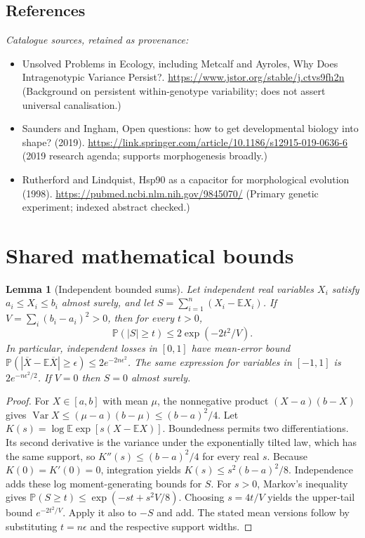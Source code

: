 \documentclass[11pt]{article}
\newcommand{\E}{\mathbb E}
\newcommand{\Prob}{\mathbb P}
\DeclareMathOperator{\Var}{Var}
\providecommand{\E}{\mathbb E}
\providecommand{\Prob}{\mathbb P}
\providecommand{\Var}{\operatorname{Var}}
\newtheorem{sharedlemma}{Lemma}[section]
\begin{document}
\subsection{References}
\noindent\emph{Catalogue sources, retained as provenance:}
\begin{itemize}
\item Unsolved Problems in Ecology, including Metcalf and Ayroles, Why Does Intragenotypic Variance Persist?. \url{https://www.jstor.org/stable/j.ctvs9fh2n} (Background on persistent within-genotype variability; does not assert universal canalisation.)
\item Saunders and Ingham, Open questions: how to get developmental biology into shape? (2019). \url{https://link.springer.com/article/10.1186/s12915-019-0636-6} (2019 research agenda; supports morphogenesis broadly.)
\item Rutherford and Lindquist, Hsp90 as a capacitor for morphological evolution (1998). \url{https://pubmed.ncbi.nlm.nih.gov/9845070/} (Primary genetic experiment; indexed abstract checked.)
\end{itemize}
\clearpage


\appendix
\section{Shared mathematical bounds}\label{app:bounds}
\begin{sharedlemma}[Independent bounded sums]\label{lem:bounded}
Let independent real variables $X_i$ satisfy $a_i\leq X_i\leq b_i$ almost surely,
and let $S=\sum_{i=1}^n(X_i-\E X_i)$. If
$V=\sum_i(b_i-a_i)^2>0$, then for every $t>0$,
\[
 \Prob(|S|\geq t)\leq 2\exp(-2t^2/V).
\]
In particular, independent losses in $[0,1]$ have mean-error bound
$\Prob(|\overline X-\E\overline X|\geq\epsilon)
\leq2e^{-2n\epsilon^2}$. The same expression for variables in $[-1,1]$
is $2e^{-n\epsilon^2/2}$. If $V=0$ then $S=0$ almost surely.
\end{sharedlemma}
\begin{proof}
For $X\in[a,b]$ with mean $\mu$, the nonnegative product
$(X-a)(b-X)$ gives
$\Var X\leq(\mu-a)(b-\mu)\leq(b-a)^2/4$.
Let $K(s)=\log\E\exp[s(X-\E X)]$.
Boundedness permits two differentiations. Its second derivative is the variance
under the exponentially tilted law, which has the same support, so
$K''(s)\leq(b-a)^2/4$ for every real $s$.
Because $K(0)=K'(0)=0$, integration yields
$K(s)\leq s^2(b-a)^2/8$.
Independence adds these log moment-generating bounds for $S$.
For $s>0$, Markov's inequality gives
$\Prob(S\geq t)\leq\exp(-st+s^2V/8)$.
Choosing $s=4t/V$ yields the upper-tail bound $e^{-2t^2/V}$.
Apply it also to $-S$ and add. The stated mean versions follow by substituting
$t=n\epsilon$ and the respective support widths.
\end{proof}
\end{document}

